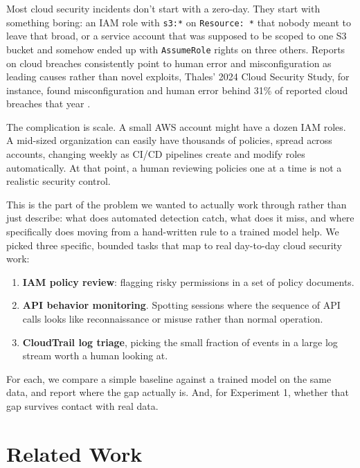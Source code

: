 \documentclass[11pt,a4paper]{article}
\begin{document}
Most cloud security incidents don't start with a zero-day. They start with something boring: an IAM role with \texttt{s3:*} on \texttt{Resource: *} that nobody meant to leave that broad, or a service account that was supposed to be scoped to one S3 bucket and somehow ended up with \texttt{AssumeRole} rights on three others. Reports on cloud breaches consistently point to human error and misconfiguration as leading causes rather than novel exploits, Thales' 2024 Cloud Security Study, for instance, found misconfiguration and human error behind 31\% of reported cloud breaches that year \cite{thales2024}.

The complication is scale. A small AWS account might have a dozen IAM roles. A mid-sized organization can easily have thousands of policies, spread across accounts, changing weekly as CI/CD pipelines create and modify roles automatically. At that point, a human reviewing policies one at a time is not a realistic security control.

This is the part of the problem we wanted to actually work through rather than just describe: what does automated detection catch, what does it miss, and where specifically does moving from a hand-written rule to a trained model help. We picked three specific, bounded tasks that map to real day-to-day cloud security work:

\begin{enumerate}
\item \textbf{IAM policy review}: flagging risky permissions in a set of policy documents.
\item \textbf{API behavior monitoring}. Spotting sessions where the sequence of API calls looks like reconnaissance or misuse rather than normal operation.
\item \textbf{CloudTrail log triage}, picking the small fraction of events in a large log stream worth a human looking at.
\end{enumerate}

For each, we compare a simple baseline against a trained model on the same data, and report where the gap actually is. And, for Experiment 1, whether that gap survives contact with real data.

\section{Related Work}
\end{document}
